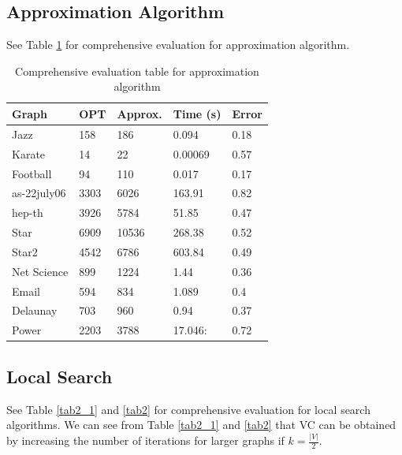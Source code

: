 \subsection{Approximation Algorithm}
See Table \ref{tab1} for comprehensive evaluation for approximation algorithm.
\begin{table}[htb]
\caption{Comprehensive evaluation table for approximation algorithm}
\label{tab1}
\begin{minipage}{\columnwidth}
\begin{center}
\begin{tabular}{@{}lllll@{}}
\toprule
Graph        & OPT  & Approx. & Time (s) & Error \\ \midrule
Jazz         & 158  & 186     & 0.094    & 0.18  \\
Karate       & 14   & 22      & 0.00069  & 0.57  \\
Football     & 94   & 110     & 0.017    & 0.17  \\
as-22july06 & 3303 & 6026    & 163.91    & 0.82  \\
hep-th       & 3926 & 5784    & 51.85    & 0.47  \\
Star         & 6909 & 10536   & 268.38    & 0.52  \\
Star2        & 4542 & 6786    & 603.84   & 0.49  \\
Net Science  & 899  & 1224    & 1.44     & 0.36  \\
Email        & 594  & 834     & 1.089     & 0.4   \\
Delaunay     & 703  & 960     & 0.94     & 0.37  \\
Power        & 2203 & 3788    & 17.046:    & 0.72  \\ \bottomrule
\end{tabular}
\end{center}
\end{minipage}
\end{table}

\subsection{Local Search}
See Table \ref{tab2_1} and \ref{tab2} for comprehensive evaluation for local search algorithms. We can see from Table \ref{tab2_1} and \ref{tab2} that VC can be obtained by increasing the number of iterations for larger graphs if $k=\frac{\left| V \right|}{2}$.

